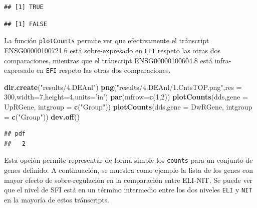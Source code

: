 \documentclass[
]{article}
\newenvironment{Shaded}{\begin{snugshade}}{\end{snugshade}}
\newcommand{\DataTypeTok}[1]{\textcolor[rgb]{0.13,0.29,0.53}{#1}}
\newcommand{\DecValTok}[1]{\textcolor[rgb]{0.00,0.00,0.81}{#1}}
\newcommand{\KeywordTok}[1]{\textcolor[rgb]{0.13,0.29,0.53}{\textbf{#1}}}
\newcommand{\NormalTok}[1]{#1}
\newcommand{\OperatorTok}[1]{\textcolor[rgb]{0.81,0.36,0.00}{\textbf{#1}}}
\newcommand{\StringTok}[1]{\textcolor[rgb]{0.31,0.60,0.02}{#1}}
\begin{document}
\begin{verbatim}
## [1] TRUE
\end{verbatim}

\begin{Shaded}
\end{Shaded}

\begin{verbatim}
## [1] FALSE
\end{verbatim}

La función \texttt{plotCounts} permite ver que efectivamente el
tránscript ENSG00000100721.6 está sobre-expresado en \texttt{EFI}
respeto las otras dos comparaciones, mientras que el tránscript
ENSG00000100604.8 está infra-expresado en \texttt{EFI} respeto las otras
dos comparaciones.

\begin{Shaded}
\begin{Highlighting}[]
\KeywordTok{dir.create}\NormalTok{(}\StringTok{"results/4.DEAnl"}\NormalTok{)}
\KeywordTok{png}\NormalTok{(}\StringTok{"results/4.DEAnl/1.CntsTOP.png"}\NormalTok{,}\DataTypeTok{res =} \DecValTok{300}\NormalTok{,}\DataTypeTok{width=}\DecValTok{7}\NormalTok{,}\DataTypeTok{height=}\DecValTok{4}\NormalTok{,}\DataTypeTok{units=}\StringTok{'in'}\NormalTok{)}
\KeywordTok{par}\NormalTok{(}\DataTypeTok{mfrow=}\KeywordTok{c}\NormalTok{(}\DecValTok{1}\NormalTok{,}\DecValTok{2}\NormalTok{))}
\KeywordTok{plotCounts}\NormalTok{(dds,}\DataTypeTok{gene =}\NormalTok{ UpRGene, }\DataTypeTok{intgroup =} \KeywordTok{c}\NormalTok{(}\StringTok{"Group"}\NormalTok{))}
\KeywordTok{plotCounts}\NormalTok{(dds,}\DataTypeTok{gene =}\NormalTok{ DwRGene, }\DataTypeTok{intgroup =} \KeywordTok{c}\NormalTok{(}\StringTok{"Group"}\NormalTok{))}
\KeywordTok{dev.off}\NormalTok{()}
\end{Highlighting}
\end{Shaded}

\begin{verbatim}
## pdf 
##   2
\end{verbatim}

Esta opción permite representar de forma simple los \texttt{counts} para
un conjunto de genes definido. A continuación, se muestra como ejemplo
la lista de los genes con mayor efecto de sobre-regulación en la
comparación entre ELI-NIT. Se puede ver que el nivel de SFI está en un
término intermedio entre los dos niveles \texttt{ELI} y \texttt{NIT} en
la mayoría de estos tránscripts.
\end{document}
